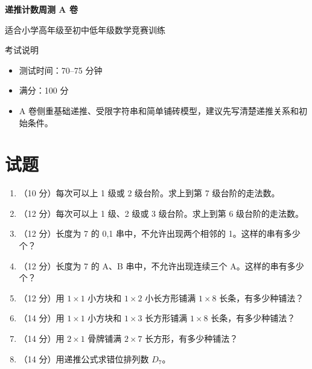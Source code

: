 \documentclass[11pt,a4paper,fontset=fandol]{ctexart}
\newcommand{\answerspace}{\vspace{2.3cm}}
\newcommand{\biganswerspace}{\vspace{3.1cm}}
\begin{document}
\thispagestyle{empty}
\begin{center}
{\fontsize{22}{28}\selectfont\bfseries 递推计数周测 A 卷\par}
\vspace{0.4cm}
{\large 适合小学高年级至初中低年级数学竞赛训练\par}
\end{center}

\begin{infobox}{考试说明}
\begin{itemize}
  \item 测试时间：70--75 分钟
  \item 满分：100 分
  \item A 卷侧重基础递推、受限字符串和简单铺砖模型，建议先写清楚递推关系和初始条件。
\end{itemize}
\end{infobox}

\section{试题}

\begin{enumerate}
  \item （10 分）每次可以上 1 级或 2 级台阶。求上到第 7 级台阶的走法数。
  \answerspace

  \item （12 分）每次可以上 1 级、2 级或 3 级台阶。求上到第 6 级台阶的走法数。
  \answerspace

  \item （12 分）长度为 7 的 0,1 串中，不允许出现两个相邻的 1。这样的串有多少个？
  \answerspace

  \item （12 分）长度为 7 的 A、B 串中，不允许出现连续三个 A。这样的串有多少个？
  \answerspace

  \item （12 分）用 $1\times 1$ 小方块和 $1\times 2$ 小长方形铺满 $1\times 8$ 长条，有多少种铺法？
  \answerspace

  \item （14 分）用 $1\times 1$ 小方块和 $1\times 3$ 长方形铺满 $1\times 8$ 长条，有多少种铺法？
  \biganswerspace

  \item （14 分）用 $2\times 1$ 骨牌铺满 $2\times 7$ 长方形，有多少种铺法？
  \biganswerspace

  \item （14 分）用递推公式求错位排列数 $D_7$。
  \answerspace
\end{enumerate}
\end{document}

